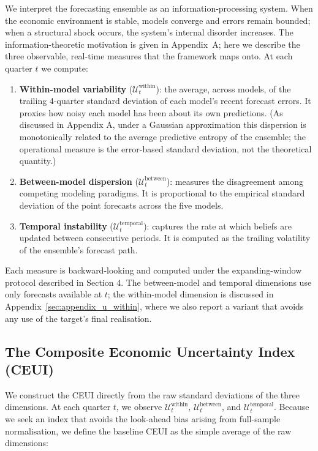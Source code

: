 \documentclass[12pt,a4paper]{article}
\theoremstyle{remark}
\begin{document}
We interpret the forecasting ensemble as an information-processing system. When the economic environment is stable, models converge and errors remain bounded; when a structural shock occurs, the system's internal disorder increases. The information-theoretic motivation is given in Appendix~A; here we describe the three observable, real-time measures that the framework maps onto. At each quarter $t$ we compute:

\begin{enumerate}
    \item \textbf{Within-model variability} ($\mathcal{U}^{\text{within}}_t$): the average, across models, of the trailing 4-quarter standard deviation of each model's recent forecast errors. It proxies how noisy each model has been about its own predictions. (As discussed in Appendix A, under a Gaussian approximation this dispersion is monotonically related to the average predictive entropy of the ensemble; the operational measure is the error-based standard deviation, not the theoretical quantity.)
    \item \textbf{Between-model dispersion} ($\mathcal{U}^{\text{between}}_t$): measures the disagreement among competing modeling paradigms. It is proportional to the empirical standard deviation of the point forecasts across the five models.
    \item \textbf{Temporal instability} ($\mathcal{U}^{\text{temporal}}_t$): captures the rate at which beliefs are updated between consecutive periods. It is computed as the trailing volatility of the ensemble's forecast path.
\end{enumerate}

Each measure is backward-looking and computed under the expanding-window protocol described in Section 4. The between-model and temporal dimensions use only forecasts available at $t$; the within-model dimension is discussed in Appendix~\ref{sec:appendix_u_within}, where we also report a variant that avoids any use of the target's final realisation.

\subsection{The Composite Economic Uncertainty Index (CEUI)}
We construct the CEUI directly from the raw standard deviations of the three dimensions. At each quarter $t$, we observe $\mathcal{U}^{\text{within}}_t$, $\mathcal{U}^{\text{between}}_t$, and $\mathcal{U}^{\text{temporal}}_t$. Because we seek an index that avoids the look-ahead bias arising from full-sample normalisation, we define the baseline CEUI as the simple average of the raw dimensions:
\end{document}

